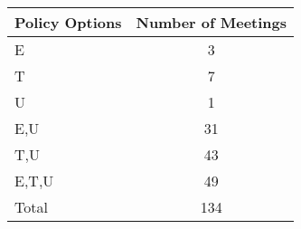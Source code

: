 \begin{tabular}{lc}
\hline\hline 
\addlinespace 
Policy Options & Number of Meetings \\ 
\hline 
E & 3 \\
T & 7 \\
U & 1 \\
E,U & 31 \\
T,U & 43 \\
E,T,U & 49 \\
\addlinespace 
Total & 134 \\
\hline 
\end{tabular}